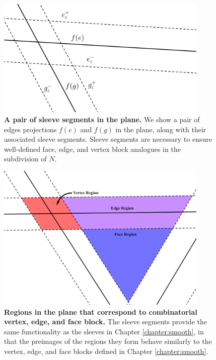 \begin{figure}[h!]
	\centering
	\includegraphics[width=0.9\textwidth]{figures/pl-sleeves.png}
	\caption{
		\textbf{A pair of sleeve segments in the plane.}
		We show a pair of edges projections $f(e)$ and $f(g)$ in the plane, along with their associated sleeve segments.
		Sleeve segments are necessary to ensure well-defined face, edge, and vertex block analogues in the subdivision of $N$.
	}
	\label{fig:pl-sleeves}
\end{figure}

\begin{figure}[h!]
	\centering
	\includegraphics[width=0.9\textwidth]{figures/pl-regions.png}
	\caption{
		\textbf{Regions in the plane that correspond to combinatorial vertex, edge, and face block.}
		The sleeve segments provide the same functionality as the sleeves in Chapter \ref{chapter:smooth}, in that the preimages of the regions they form behave similarly to the vertex, edge, and face blocks defined in Chapter \ref{chapter:smooth}.
	}
	\label{fig:pl-regions}
\end{figure}

